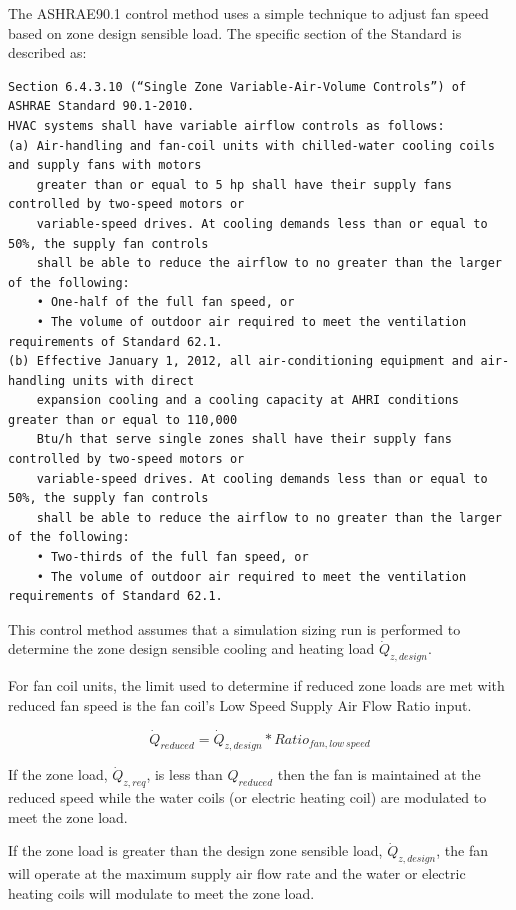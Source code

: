 The ASHRAE90.1 control method uses a simple technique to adjust fan speed based on zone design sensible load. The specific section of the Standard is described as:

\begin{lstlisting}
Section 6.4.3.10 (“Single Zone Variable-Air-Volume Controls”) of ASHRAE Standard 90.1-2010.
HVAC systems shall have variable airflow controls as follows:
(a) Air-handling and fan-coil units with chilled-water cooling coils and supply fans with motors
    greater than or equal to 5 hp shall have their supply fans controlled by two-speed motors or
    variable-speed drives. At cooling demands less than or equal to 50%, the supply fan controls
    shall be able to reduce the airflow to no greater than the larger of the following:
    • One-half of the full fan speed, or
    • The volume of outdoor air required to meet the ventilation requirements of Standard 62.1.
(b) Effective January 1, 2012, all air-conditioning equipment and air-handling units with direct
    expansion cooling and a cooling capacity at AHRI conditions greater than or equal to 110,000
    Btu/h that serve single zones shall have their supply fans controlled by two-speed motors or
    variable-speed drives. At cooling demands less than or equal to 50%, the supply fan controls
    shall be able to reduce the airflow to no greater than the larger of the following:
    • Two-thirds of the full fan speed, or
    • The volume of outdoor air required to meet the ventilation requirements of Standard 62.1.
\end{lstlisting}

This control method assumes that a simulation sizing run is performed to determine the zone design sensible cooling and heating load \({\dot Q_{z,design}}\).

For fan coil units, the limit used to determine if reduced zone loads are met with reduced fan speed is the fan coil's Low Speed Supply Air Flow Ratio input.

\begin{equation}
{\dot Q_{reduced}} = {\dot Q_{z,design}} * {Ratio_{fan,low~speed}}
\end{equation}

If the zone load, \({\dot Q_{z,req}}\), is less than \({Q_{reduced}}\) then the fan is maintained at the reduced speed while the water coils (or electric heating coil) are modulated to meet the zone load.

If the zone load is greater than the design zone sensible load, \({\dot Q_{z,design}}\), the fan will operate at the maximum supply air flow rate and the water or electric heating coils will modulate to meet the zone load.

